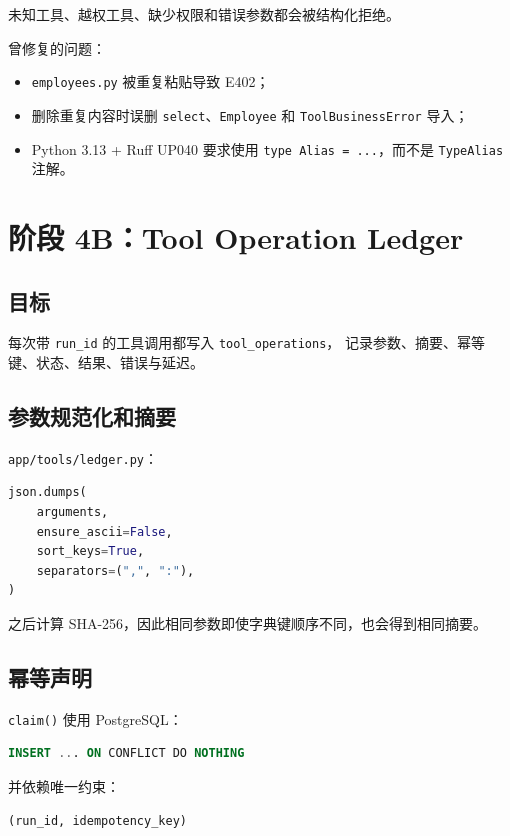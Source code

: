 \documentclass[11pt,a4paper]{ctexart}
\begin{document}
未知工具、越权工具、缺少权限和错误参数都会被结构化拒绝。

曾修复的问题：

\begin{itemize}[leftmargin=2em]
  \item \texttt{employees.py} 被重复粘贴导致 E402；
  \item 删除重复内容时误删 \texttt{select}、\texttt{Employee} 和
        \texttt{ToolBusinessError} 导入；
  \item Python 3.13 + Ruff UP040 要求使用
        \texttt{type Alias = ...}，而不是
        \texttt{TypeAlias} 注解。
\end{itemize}

\section{阶段 4B：Tool Operation Ledger}

\subsection{目标}

每次带 \texttt{run\_id} 的工具调用都写入 \texttt{tool\_operations}，
记录参数、摘要、幂等键、状态、结果、错误与延迟。

\subsection{参数规范化和摘要}

\texttt{app/tools/ledger.py}：

\begin{lstlisting}[language=Python]
json.dumps(
    arguments,
    ensure_ascii=False,
    sort_keys=True,
    separators=(",", ":"),
)
\end{lstlisting}

之后计算 SHA-256，因此相同参数即使字典键顺序不同，也会得到相同摘要。

\subsection{幂等声明}

\texttt{claim()} 使用 PostgreSQL：

\begin{lstlisting}[language=SQL]
INSERT ... ON CONFLICT DO NOTHING
\end{lstlisting}

并依赖唯一约束：

\begin{lstlisting}
(run_id, idempotency_key)
\end{lstlisting}
\end{document}
